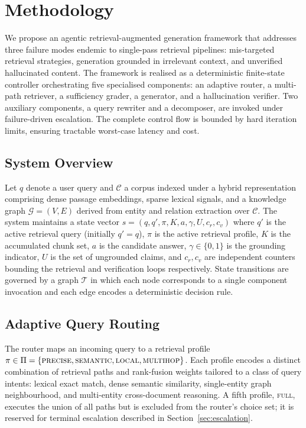 \section{Methodology}
\label{sec:methodology}

We propose an agentic retrieval-augmented generation framework that
addresses three failure modes endemic to single-pass retrieval pipelines:
mis-targeted retrieval strategies, generation grounded in irrelevant
context, and unverified hallucinated content. The framework is realised
as a deterministic finite-state controller orchestrating five
specialised components: an adaptive router, a multi-path retriever, a
sufficiency grader, a generator, and a hallucination verifier. Two
auxiliary components, a query rewriter and a decomposer, are invoked
under failure-driven escalation. The complete control flow is bounded
by hard iteration limits, ensuring tractable worst-case latency and
cost.

\subsection{System Overview}
\label{sec:overview}

Let $q$ denote a user query and $\mathcal{C}$ a corpus indexed under a
hybrid representation comprising dense passage embeddings, sparse
lexical signals, and a knowledge graph $\mathcal{G}=(V,E)$ derived from
entity and relation extraction over $\mathcal{C}$. The system maintains
a state vector
$s = (q, q', \pi, K, a, \gamma, U, c_r, c_v)$
where $q'$ is the active retrieval query (initially $q'=q$), $\pi$ is
the active retrieval profile, $K$ is the accumulated chunk set, $a$ is
the candidate answer, $\gamma \in \{0,1\}$ is the grounding indicator,
$U$ is the set of ungrounded claims, and $c_r, c_v$ are independent
counters bounding the retrieval and verification loops respectively.
State transitions are governed by a graph $\mathcal{T}$ in which each
node corresponds to a single component invocation and each edge encodes
a deterministic decision rule.

\subsection{Adaptive Query Routing}
\label{sec:router}

The router maps an incoming query to a retrieval profile
$\pi \in \Pi = \{\textsc{precise}, \textsc{semantic}, \textsc{local},
\textsc{multihop}\}$. Each profile encodes a distinct combination of
retrieval paths and rank-fusion weights tailored to a class of query
intents: lexical exact match, dense semantic similarity, single-entity
graph neighbourhood, and multi-entity cross-document reasoning. A fifth
profile, \textsc{full}, executes the union of all paths but is excluded
from the router's choice set; it is reserved for terminal escalation
described in Section~\ref{sec:escalation}.

